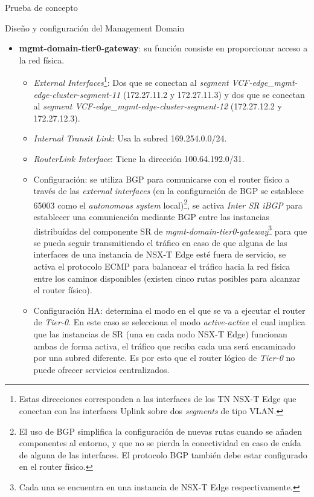 \begin{section}{Prueba de concepto}
\begin{subsection}{Diseño y configuración del Management Domain}
    \begin{itemize}
      \item \textbf{mgmt-domain-tier0-gateway}: su función consiste en proporcionar acceso a la red física.
        \begin{itemize}
          \item \textit{External Interfaces}\footnote{Estas direcciones corresponden a las interfaces de los TN NSX-T Edge que conectan con las interfaces Uplink sobre dos \textit{segments} de tipo VLAN.}: Dos que se conectan al \textit{segment} \textit{VCF-edge\_mgmt-edge-cluster-segment-11} (172.27.11.2 y 172.27.11.3) y dos que se conectan al \textit{segment} \textit{VCF-edge\_mgmt-edge-cluster-segment-12} (172.27.12.2 y 172.27.12.3).
          \item \textit{Internal Transit Link}: Usa la subred 169.254.0.0/24.
          \item \textit{RouterLink Interface}: Tiene la dirección 100.64.192.0/31.
          \item Configuración: se utiliza BGP para comunicarse con el router físico a través de las \textit{external interfaces} (en la configuración de BGP se establece 65003 como el \textit{autonomous system} local)\footnote{El uso de BGP simplifica la configuración de nuevas rutas cuando se añaden componentes al entorno, y que no se pierda la conectividad en caso de caída de alguna de las interfaces. El protocolo BGP también debe estar configurado en el router físico.}, se activa \textit{Inter SR iBGP} para establecer una comunicación mediante BGP entre las instancias distribuídas del componente SR de \textit{mgmt-domain-tier0-gateway}\footnote{Cada una se encuentra en una instancia de NSX-T Edge respectivamente.} para que se pueda seguir transmitiendo el tráfico en caso de que alguna de las interfaces de una instancia de NSX-T Edge esté fuera de servicio, se activa el protocolo ECMP para balancear el tráfico hacia la red física entre los caminos disponibles (existen cinco rutas posibles para alcanzar el router físico). 
          \item Configuración HA: determina el modo en el que se va a ejecutar el router de \textit{Tier-0}. En este caso se selecciona el modo \textit{active-active} el cual implica que las instancias de SR (una en cada nodo NSX-T Edge) funcionan ambas de forma activa, el tráfico que reciba cada una será encaminado por una subred diferente. Es por esto que el router lógico de \textit{Tier-0} no puede ofrecer servicios centralizados.
        \end{itemize}
    

\end{itemize}
\end{subsection}
\end{section}
